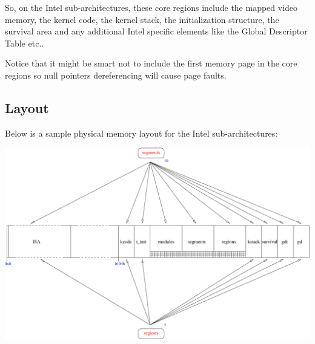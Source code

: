 So, on the Intel sub-architectures, these core regions include the mapped
video memory, the kernel code, the kernel stack, the initialization
structure, the survival area and any additional Intel specific elements
like the Global Descriptor Table etc..

Notice that it might be smart not to include the first memory page in
the core regions so null pointers dereferencing will cause page faults.

%
%

\subsection{Layout}

Below is a sample physical memory layout for the Intel sub-architectures:

\begin{center}
  \includegraphics[scale=0.7]{figures/k1-memory-layout.pdf}
\end{center}
